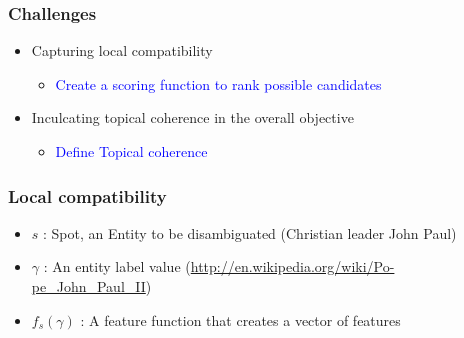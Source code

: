 \begin{frame}
 \frametitle{Challenges}
 \begin{itemize}
  \item Capturing local compatibility
  \begin{itemize}
   \item \textcolor{blue}{Create a scoring function to rank possible candidates}
  \end{itemize}

  \item Inculcating topical coherence in the overall objective

  \begin{itemize}
   \item \textcolor{blue}{Define Topical coherence}
  \end{itemize}

  \end{itemize}

\end{frame}

\begin{frame}
 \frametitle{Local compatibility}
 \begin{itemize}
  \item $s$ : Spot, an Entity to be disambiguated (Christian leader John Paul) \bigskip 
  \item $\gamma$ : An entity label value (\url{http://en.wikipedia.org/wiki/Po-pe_John_Paul_II})  \bigskip 
 \item $f_s(\gamma)$ : A feature function that creates a vector of features
 \end{itemize}

  
\end{frame}

